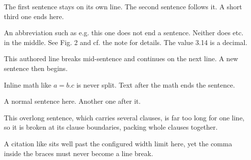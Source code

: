 \documentclass{article}
\begin{document}
The first sentence stays on its own line.
The second sentence follows it.
A short third one ends here.

An abbreviation such as e.g. this one does not end a sentence.
Neither does etc. in the middle.
See Fig. 2 and cf. the note for details.
The value 3.14 is a decimal.

This authored line breaks mid-sentence and
continues on the next line.
A new sentence then begins.

Inline math like $a = b. c$ is never split.
Text after the math ends the sentence.

A normal sentence here.
Another one after it.

This overlong sentence, which carries several clauses,
is far too long for one line, so it is broken at its clause boundaries,
packing whole clauses together.

A citation like \cite{smith2020, jones2021} sits well past the
configured width limit here,
yet the comma inside the braces must never become a line break.
\end{document}
